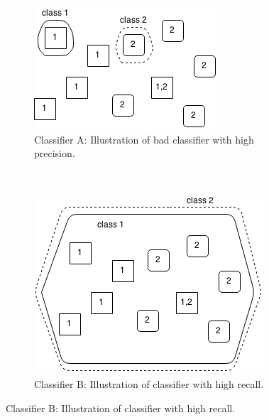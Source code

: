 \begin{figure}[h]
\centering
\begin{subfigure}[b]{0.6\textwidth}
\includegraphics[width=\textwidth]{Chapters/Methods/High_precision}
\caption[Illustration of bad classifier with high precision]{Classifier A: Illustration of bad classifier with high precision.}
\label{fig:high_precision}
\end{subfigure}
\\[10pt]
\begin{subfigure}[b]{0.7\textwidth}
\includegraphics[width=\textwidth]{Chapters/Methods/High_recall}
\caption[Illustration of bad classifier with high recall]{Classifier B: Illustration of classifier with high recall.}
\label{fig:high_recall}
\end{subfigure}
\end{figure}


